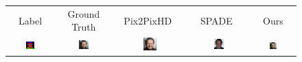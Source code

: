 \addtolength{\tabcolsep}{-4.5pt}    
\bgroup
\def\arraystretch{0.5}%
\begin{figure}[]
\begin{tabular} {cc|cc|c}
 Label & Ground Truth & Pix2PixHD~\cite{wang2018pix2pixHD} &  SPADE~\cite{park2019SPADE} & Ours\\
\includegraphics[width=0.1932\textwidth]{Images/Rec/Faces/label/28016.png} & \includegraphics[width=0.1932\textwidth]{Images/Rec/Faces/gt/28016.jpg} &
\includegraphics[width=0.1932\textwidth]{Images/Rec/Faces/pix2pixhd/28016.jpg} &   \includegraphics[width=0.1932\textwidth]{Images/Rec/Faces/spade/28016.jpg} &  \includegraphics[width=0.1932\textwidth]{Images/Rec/Faces/ours/28016.png} \\




\end{tabular}
\end{figure}
